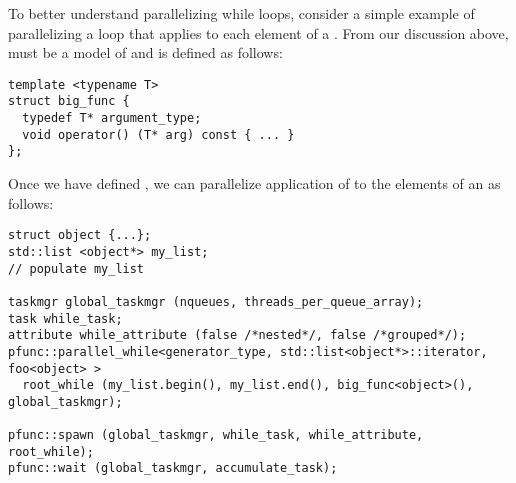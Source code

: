%
To better understand parallelizing while loops, consider a simple example of
parallelizing a loop that applies  to each element of a
.
%
From our discussion above,  must be a model of
 and is defined as follows:
%
\begin{center}
\begin{minipage}{0.45\textwidth}
\begin{lstlisting}
template <typename T>
struct big_func { 
  typedef T* argument_type;
  void operator() (T* arg) const { ... }
};
\end{lstlisting}
\end{minipage}
\end{center}
%
Once we have defined , we can parallelize application of 
 to the elements of an  as follows:
%
\begin{center}
\begin{minipage}{0.7\textwidth}
\begin{lstlisting}
struct object {...};
std::list <object*> my_list;
// populate my_list

taskmgr global_taskmgr (nqueues, threads_per_queue_array);
task while_task;
attribute while_attribute (false /*nested*/, false /*grouped*/);
pfunc::parallel_while<generator_type, std::list<object*>::iterator, foo<object> > 
  root_while (my_list.begin(), my_list.end(), big_func<object>(), global_taskmgr);

pfunc::spawn (global_taskmgr, while_task, while_attribute, root_while);
pfunc::wait (global_taskmgr, accumulate_task);
\end{lstlisting}
\end{minipage}
\end{center}
